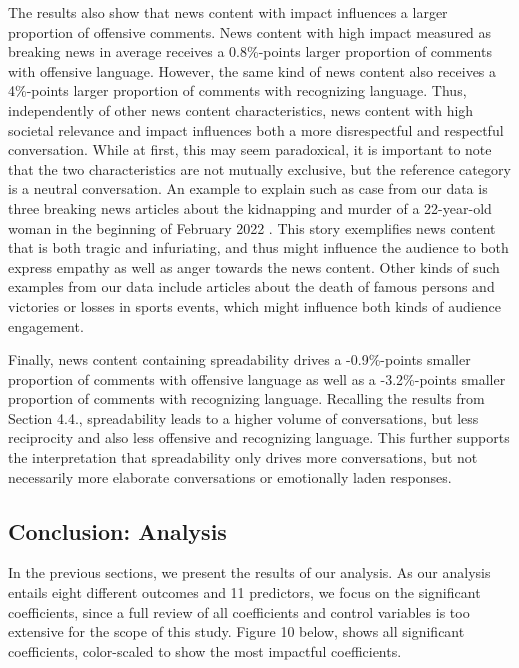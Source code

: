 \documentclass[
]{article}
\begin{document}
The results also show that news content with impact influences a larger
proportion of offensive comments. News content with high impact measured
as breaking news in average receives a 0.8\%-points larger proportion of
comments with offensive language. However, the same kind of news content
also receives a 4\%-points larger proportion of comments with
recognizing language. Thus, independently of other news content
characteristics, news content with high societal relevance and impact
influences both a more disrespectful and respectful conversation. While
at first, this may seem paradoxical, it is important to note that the
two characteristics are not mutually exclusive, but the reference
category is a neutral conversation. An example to explain such as case
from our data is three breaking news articles about the kidnapping and
murder of a 22-year-old woman in the beginning of February 2022 . This
story exemplifies news content that is both tragic and infuriating, and
thus might influence the audience to both express empathy as well as
anger towards the news content. Other kinds of such examples from our
data include articles about the death of famous persons and victories or
losses in sports events, which might influence both kinds of audience
engagement.

Finally, news content containing spreadability drives a -0.9\%-points
smaller proportion of comments with offensive language as well as a
-3.2\%-points smaller proportion of comments with recognizing language.
Recalling the results from Section 4.4., spreadability leads to a higher
volume of conversations, but less reciprocity and also less offensive
and recognizing language. This further supports the interpretation that
spreadability only drives more conversations, but not necessarily more
elaborate conversations or emotionally laden responses.

\hypertarget{conclusion-analysis}{%
\subsection{Conclusion: Analysis}\label{conclusion-analysis}}

In the previous sections, we present the results of our analysis. As our
analysis entails eight different outcomes and 11 predictors, we focus on
the significant coefficients, since a full review of all coefficients
and control variables is too extensive for the scope of this study.
Figure 10 below, shows all significant coefficients, color-scaled to
show the most impactful coefficients.
\end{document}
